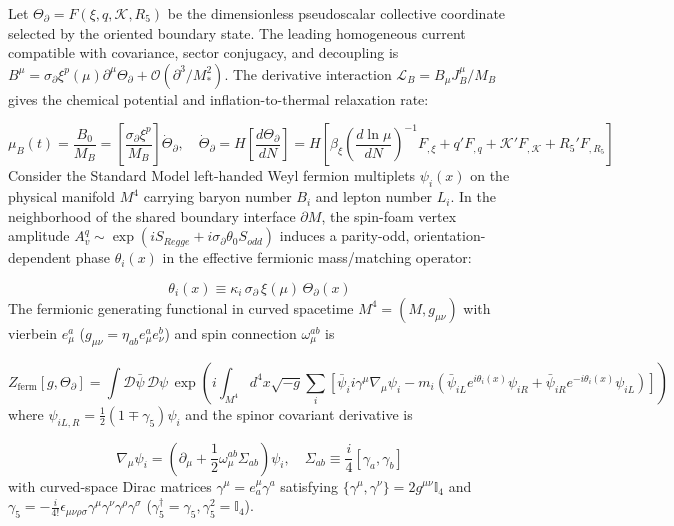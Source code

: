 \documentclass[aps,prd,onecolumn,superscriptaddress,nofootinbib,longbibliography,10pt]{revtex4-2}
\begin{document}
{{  Let \(\Theta_\partial = F(\xi,q,\mathcal{K},R_5)\) be the dimensionless pseudoscalar collective coordinate selected by the oriented boundary state. The leading homogeneous current compatible with covariance, sector conjugacy, and decoupling is \(B^\mu = \sigma_\partial\xi^p(\mu)\partial^\mu\Theta_\partial + \mathcal{O}(\partial^3/M_*^2)\). The derivative interaction \(\mathcal{L}_B = B_\mu J_B^\mu / M_B\) gives the chemical potential and inflation-to-thermal relaxation rate:


  \[ \mu_B(t) = \frac{B_0}{M_B} = \left[\frac{\sigma_\partial\xi^p}{M_B}\right]\dot{\Theta}_\partial, \quad \dot{\Theta}_\partial = H\left[\frac{d\Theta_\partial}{dN}\right] = H\left[ \beta_\xi\left(\frac{d\ln\mu}{dN}\right)^{-1}F_{,\xi} + q'F_{,q} + \mathcal{K}'F_{,\mathcal{K}} + R_5'F_{,R_5} \right] \]
  Consider the Standard Model left-handed Weyl fermion multiplets \(\psi_i(x)\) on the physical manifold \(M^4\) carrying baryon number \(B_i\) and lepton number \(L_i\). In the neighborhood of the shared boundary interface \(\partial M\), the spin-foam vertex amplitude \(A_v^q \sim \exp(iS_{Regge} + i\sigma_\partial\theta_0 S_{odd})\) induces a parity-odd, orientation-dependent phase \(\theta_i(x)\) in the effective fermionic mass/matching operator:


  \[ \theta_i(x) \equiv \kappa_i\,\sigma_\partial\,\xi(\mu)\,\Theta_\partial(x) \]
  The fermionic generating functional in curved spacetime \(M^4 = (M, g_{\mu\nu})\) with vierbein \(e_\mu^a\) (\(g_{\mu\nu} = \eta_{ab}e_\mu^a e_\nu^b\)) and spin connection \(\omega_\mu^{ab}\) is


  \[ Z_{\text{ferm}}[g,\Theta_\partial] = \int \mathcal{D}\bar{\psi}\,\mathcal{D}\psi\,\exp\left( i\int_{M^4} d^4x\sqrt{-g}\sum_i \left[ \bar{\psi}_i i\gamma^\mu\nabla_\mu\psi_i - m_i\left(\bar{\psi}_{iL}e^{i\theta_i(x)}\psi_{iR} + \bar{\psi}_{iR}e^{-i\theta_i(x)}\psi_{iL}\right) \right] \right) \]
  where \(\psi_{iL,R} = \frac{1}{2}(1 \mp \gamma_5)\psi_i\) and the spinor covariant derivative is


  \[ \nabla_\mu\psi_i = \left(\partial_\mu + \frac{1}{2}\omega_\mu^{ab}\Sigma_{ab}\right)\psi_i, \quad \Sigma_{ab} \equiv \frac{i}{4}[\gamma_a, \gamma_b] \]
  with curved-space Dirac matrices \(\gamma^\mu = e_a^\mu\gamma^a\) satisfying \(\{\gamma^\mu, \gamma^\nu\} = 2g^{\mu\nu}\mathbb{I}_4\) and \(\gamma_5 = -\frac{i}{4!}\epsilon_{\mu\nu\rho\sigma}\gamma^\mu\gamma^\nu\gamma^\rho\gamma^\sigma\) (\(\gamma_5^\dagger = \gamma_5, \gamma_5^2 = \mathbb{I}_4\)).


}}
\end{document}
